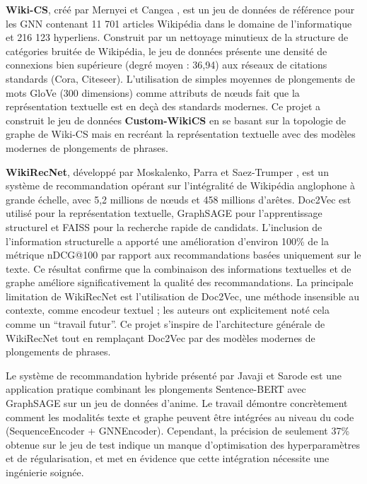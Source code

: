 \textbf{Wiki-CS}, créé par Mernyei et Cangea \cite{mernyei2020wikics}, est un jeu de données de référence pour les GNN contenant 11 701 articles Wikipédia dans le domaine de l'informatique et 216 123 hyperliens. Construit par un nettoyage minutieux de la structure de catégories bruitée de Wikipédia, le jeu de données présente une densité de connexions bien supérieure (degré moyen : 36,94) aux réseaux de citations standards (Cora, Citeseer). L'utilisation de simples moyennes de plongements de mots GloVe (300 dimensions) comme attributs de n\oe uds fait que la représentation textuelle est en deçà des standards modernes. Ce projet a construit le jeu de données \textbf{Custom-WikiCS} en se basant sur la topologie de graphe de Wiki-CS mais en recréant la représentation textuelle avec des modèles modernes de plongements de phrases.

\textbf{WikiRecNet}, développé par Moskalenko, Parra et Saez-Trumper \cite{wikirecnet2020}, est un système de recommandation opérant sur l'intégralité de Wikipédia anglophone à grande échelle, avec 5,2 millions de n\oe uds et 458 millions d'arêtes. Doc2Vec est utilisé pour la représentation textuelle, GraphSAGE pour l'apprentissage structurel et FAISS pour la recherche rapide de candidats. L'inclusion de l'information structurelle a apporté une amélioration d'environ 100\% de la métrique nDCG@100 par rapport aux recommandations basées uniquement sur le texte. Ce résultat confirme que la combinaison des informations textuelles et de graphe améliore significativement la qualité des recommandations. La principale limitation de WikiRecNet est l'utilisation de Doc2Vec, une méthode insensible au contexte, comme encodeur textuel ; les auteurs ont explicitement noté cela comme un ``travail futur''. Ce projet s'inspire de l'architecture générale de WikiRecNet tout en remplaçant Doc2Vec par des modèles modernes de plongements de phrases.

Le système de recommandation hybride présenté par Javaji et Sarode \cite{anime_hybrid_gnn_bert} est une application pratique combinant les plongements Sentence-BERT avec GraphSAGE sur un jeu de données d'anime. Le travail démontre concrètement comment les modalités texte et graphe peuvent être intégrées au niveau du code (SequenceEncoder + GNNEncoder). Cependant, la précision de seulement 37\% obtenue sur le jeu de test indique un manque d'optimisation des hyperparamètres et de régularisation, et met en évidence que cette intégration nécessite une ingénierie soignée.

